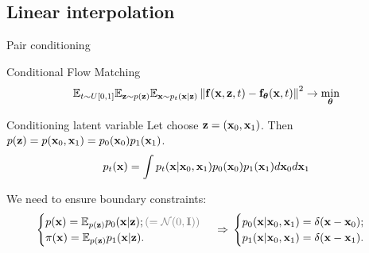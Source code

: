 \subsection{Linear interpolation}
\begin{frame}{Pair conditioning}
	\begin{block}{Conditional Flow Matching}
		\vspace{-0.3cm}
		\[
			\mathbb{E}_{t \sim U[0, 1]} \mathbb{E}_{\mathbf{z} \sim p(\mathbf{z})} \mathbb{E}_{\mathbf{x} \sim p_t(\mathbf{x} | \mathbf{z})}\left\| \mathbf{f}(\mathbf{x}, \mathbf{z}, t) - \mathbf{f}_{\boldsymbol{\theta}}(\mathbf{x}, t) \right\|^2 \rightarrow \min_{\boldsymbol{\theta}}
		\]
		\vspace{-0.3cm}
	\end{block}
	\begin{block}{Conditioning latent variable}
		Let choose $\mathbf{z} = (\mathbf{x}_0, \mathbf{x}_1)$. Then $p(\mathbf{z}) = p (\mathbf{x}_0, \mathbf{x}_1) = p_0(\mathbf{x}_0) p_1(\mathbf{x}_1)$.
		\[
			p_t(\mathbf{x}) = \int p_t(\mathbf{x} | \mathbf{x}_0, \mathbf{x}_1) p_0(\mathbf{x}_0) p_1(\mathbf{x}_1) d \mathbf{x}_0 d \mathbf{x}_1
		\]
	\end{block}
	We need to ensure boundary constraints:
	\[
		\begin{cases}
			p(\bx) = \bbE_{p(\bz)} p_0(\bx | \bz); {\color{gray}(= \cN(0, \bI))} \\
			\pi(\bx) = \bbE_{p(\bz)} p_1(\bx | \bz).
		\end{cases}
		\, \Rightarrow \, 
		\begin{cases}
			p_0(\bx | \bx_0, \bx_1) = \delta(\bx - \bx_0); \\
			p_1(\bx | \bx_0, \bx_1) = \delta(\bx - \bx_1).
		\end{cases}
	\]
	\vspace{-0.3cm}
\end{frame}
